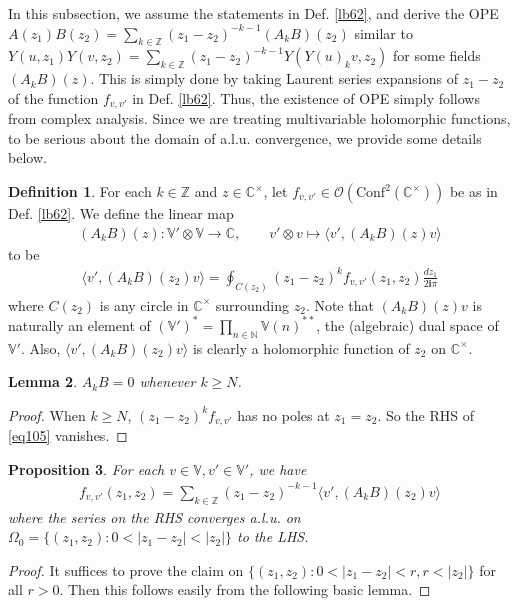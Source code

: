 \documentclass[11pt,b5paper,notitlepage]{article}
\theoremstyle{definition}
\newtheorem{df}{Definition}[section]
\theoremstyle{plain}
\newtheorem{pp}[df]{Proposition}
\newtheorem{lm}[df]{Lemma}
\newcommand{\Conf}{\mathrm{Conf}}
\newcommand{\bk}[1]{\langle {#1}\rangle}
\newcommand{\bigbk}[1]{\big\langle {#1}\big\rangle}
\newcommand{\scr}{\mathscr}
\newcommand{\im}{\mathbf{i}}
\newcommand{\Vbb}{\mathbb V}
\newcommand{\Cbb}{\mathbb C}
\newcommand{\Nbb}{\mathbb N}
\newcommand{\Zbb}{\mathbb Z}
\numberwithin{equation}{section}
\begin{document}
In this subsection, we assume the statements in Def. \ref{lb62}, and derive the OPE $A(z_1)B(z_2)=\sum_{k\in\Zbb}(z_1-z_2)^{-k-1}(A_kB)(z_2)$ similar to $Y(u,z_1)Y(v,z_2)=\sum_{k\in\Zbb}(z_1-z_2)^{-k-1}Y(Y(u)_kv,z_2)$ for some fields $(A_kB)(z)$. This is simply done by taking Laurent series expansions of $z_1-z_2$ of the function $f_{v,v'}$ in Def. \ref{lb62}. Thus, the existence of OPE simply follows from complex analysis. Since we are treating multivariable holomorphic functions, to be serious about the domain of a.l.u. convergence, we provide some details below.

\begin{df}
For each $k\in\Zbb$ and $z\in\Cbb^\times$, let $f_{v,v'}\in\scr O(\Conf^2(\Cbb^\times))$ be as in Def. \ref{lb62}. We define the linear map 
\begin{align*}
(A_kB)(z):\Vbb'\otimes \Vbb\rightarrow\Cbb,\qquad v'\otimes v\mapsto\bk{v',(A_kB)(z)v}	
\end{align*}
to be
\begin{align}
\bk{v',(A_kB)(z_2)v}=\oint_{C(z_2)}	(z_1-z_2)^kf_{v,v'}(z_1,z_2)\frac{dz_1}{2\im\pi}\label{eq105}
\end{align}
where $C(z_2)$ is any circle in $\Cbb^\times$ surrounding $z_2$. Note that $(A_kB)(z)v$ is naturally an element of $(\Vbb')^*=\prod_{n\in\Nbb}\Vbb(n)^{**}$, the (algebraic) dual space of $\Vbb'$. Also, $\bigbk{v',(A_kB)(z_2)v}$ is clearly a holomorphic function of $z_2$ on $\Cbb^\times$.
\end{df}	

\begin{lm}
$A_kB=0$ whenever $k\geq N$.
\end{lm}
\begin{proof}
When $k\geq N$, $(z_1-z_2)^kf_{v,v'}$ has no poles at $z_1=z_2$. So the RHS of \eqref{eq105} vanishes.
\end{proof}



\begin{pp}\label{lb73}
For each $v\in\Vbb,v'\in\Vbb'$, we have
\begin{align}
f_{v,v'}(z_1,z_2)=	\sum_{k\in\Zbb}(z_1-z_2)^{-k-1}\bigbk{v',(A_kB)(z_2)v}\label{eq112}
\end{align}
where the series on the RHS converges a.l.u. on $\Omega_0=\{(z_1,z_2):0<|z_1-z_2|<|z_2|\}$ to the LHS.
\end{pp}


\begin{proof}
It suffices to prove the claim on $\{(z_1,z_2):0<|z_1-z_2|<r,r<|z_2|\}$ for all $r>0$. Then this follows easily from the following basic lemma.
\end{proof}
\end{document}
